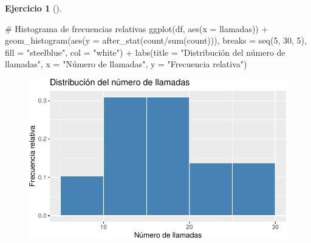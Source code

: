 \documentclass[
  a4paper,
]{scrreport}
\newenvironment{Shaded}{\begin{snugshade}}{\end{snugshade}}
\newcommand{\AttributeTok}[1]{\textcolor[rgb]{0.40,0.45,0.13}{#1}}
\newcommand{\CommentTok}[1]{\textcolor[rgb]{0.37,0.37,0.37}{#1}}
\newcommand{\DecValTok}[1]{\textcolor[rgb]{0.68,0.00,0.00}{#1}}
\newcommand{\FunctionTok}[1]{\textcolor[rgb]{0.28,0.35,0.67}{#1}}
\newcommand{\NormalTok}[1]{\textcolor[rgb]{0.00,0.23,0.31}{#1}}
\newcommand{\SpecialCharTok}[1]{\textcolor[rgb]{0.37,0.37,0.37}{#1}}
\newcommand{\StringTok}[1]{\textcolor[rgb]{0.13,0.47,0.30}{#1}}
\theoremstyle{definition}
\newtheorem{exercise}{Ejercicio}[chapter]
\theoremstyle{remark}
\begin{document}
\begin{exercise}[]
\begin{enumerate}
\begin{tcolorbox}
\begin{Shaded}
\begin{Highlighting}[]
\CommentTok{\# Histograma de frecuencias relativas}
\FunctionTok{ggplot}\NormalTok{(df, }\FunctionTok{aes}\NormalTok{(}\AttributeTok{x =}\NormalTok{ llamadas)) }\SpecialCharTok{+}
    \FunctionTok{geom\_histogram}\NormalTok{(}\FunctionTok{aes}\NormalTok{(}\AttributeTok{y =} \FunctionTok{after\_stat}\NormalTok{(count}\SpecialCharTok{/}\FunctionTok{sum}\NormalTok{(count))), }\AttributeTok{breaks =} \FunctionTok{seq}\NormalTok{(}\DecValTok{5}\NormalTok{, }\DecValTok{30}\NormalTok{, }\DecValTok{5}\NormalTok{), }\AttributeTok{fill =} \StringTok{"steelblue"}\NormalTok{, }\AttributeTok{col =} \StringTok{"white"}\NormalTok{) }\SpecialCharTok{+}
    \FunctionTok{labs}\NormalTok{(}\AttributeTok{title =} \StringTok{"Distribución del número de llamadas"}\NormalTok{, }\AttributeTok{x =} \StringTok{"Número de llamadas"}\NormalTok{, }\AttributeTok{y =} \StringTok{"Frecuencia relativa"}\NormalTok{)}
\end{Highlighting}
\end{Shaded}

  \begin{figure}[H]

  {\centering \includegraphics{03-frecuencias-graficos_files/figure-pdf/unnamed-chunk-19-2.pdf}

  }

  \end{figure}


\end{tcolorbox}
\end{enumerate}
\end{exercise}
\end{document}
